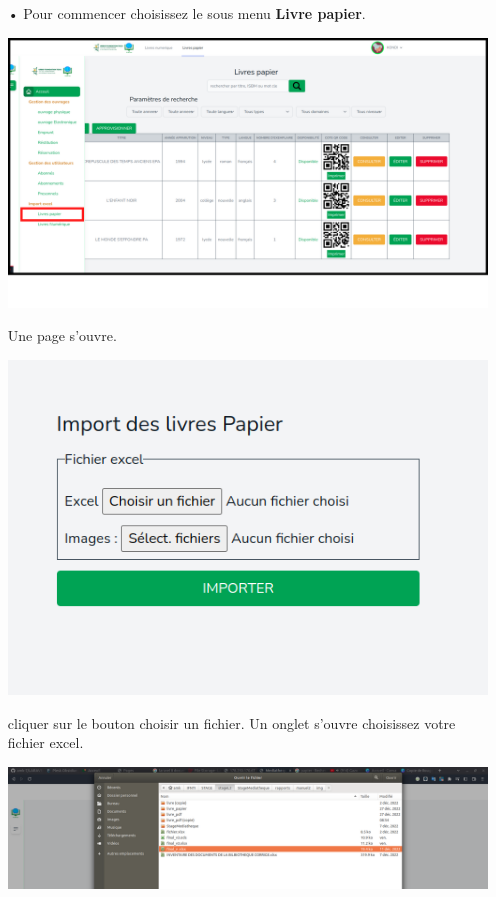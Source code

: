\documentclass[12pt,a4paper]{article}
\begin{document}
\begin{itemize}
\item[•] Pour commencer choisissez le sous menu \textbf{Livre papier}. 
\begin{center}
\includegraphics[scale=0.3]{img/import_lp.png}
\end{center}
Une page s'ouvre. 
\begin{center}
\includegraphics[scale=0.5]{img/import_view_p.png}
\end{center}
cliquer sur le bouton choisir un fichier.
Un onglet s'ouvre choisissez votre fichier excel.
\begin{center}
\includegraphics[scale=0.2]{img/open_folder.png}

\end{center}
\end{itemize}
\end{document}
